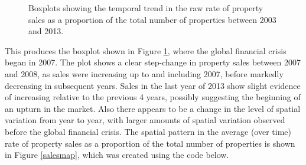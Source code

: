 \documentclass[article, nojss]{jss}
\begin{document}
\begin{figure}
\centering 
{}
\caption{Boxplots showing the temporal trend in the raw rate of property sales as a proportion of the total number of properties between 2003 and 2013.\label{salesboxplot}}
\end{figure} 


This produces the boxplot shown in Figure \ref{salesboxplot}, where the global financial crisis began in 2007. The plot shows a clear step-change in property sales between 2007 and 2008, as sales were increasing up to and including 2007, before markedly decreasing in subsequent years. Sales in the last year of 2013 show slight evidence of increasing relative to the previous 4 years, possibly suggesting the beginning of an upturn in the market. Also there appears to be a change in the level of spatial variation from year to year, with larger amounts of spatial variation observed before the global financial crisis. The spatial pattern in the average (over time) rate of property sales as a proportion of the total number of properties is shown in Figure \ref{salesmap}, which was created using the code below.

\begin{Schunk}
\end{Schunk}
\end{document}
